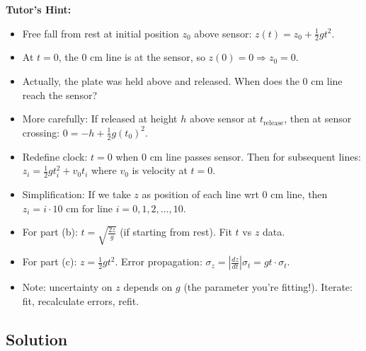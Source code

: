 \documentclass[11pt]{article}
\begin{document}
\textbf{Tutor's Hint:}
\begin{itemize}
    \item Free fall from rest at initial position $z_0$ above sensor: $z(t) = z_0 + \frac{1}{2}gt^2$.
    \item At $t=0$, the 0 cm line is at the sensor, so $z(0) = 0 \Rightarrow z_0 = 0$.
    \item Actually, the plate was held above and released. When does the 0 cm line reach the sensor?
    \item More carefully: If released at height $h$ above sensor at $t_{\text{release}}$, then at sensor crossing: $0 = -h + \frac{1}{2}g(t_0)^2$.
    \item Redefine clock: $t = 0$ when 0 cm line passes sensor. Then for subsequent lines: $z_i = \frac{1}{2}gt_i^2 + v_0 t_i$ where $v_0$ is velocity at $t=0$.
    \item Simplification: If we take $z$ as position of each line wrt 0 cm line, then $z_i = i \cdot 10$ cm for line $i = 0, 1, 2, \ldots, 10$.
    \item For part (b): $t = \sqrt{\frac{2z}{g}}$ (if starting from rest). Fit $t$ vs $z$ data.
    \item For part (c): $z = \frac{1}{2}gt^2$. Error propagation: $\sigma_z = \left|\frac{dz}{dt}\right| \sigma_t = gt \cdot \sigma_t$.
    \item Note: uncertainty on $z$ depends on $g$ (the parameter you're fitting!). Iterate: fit, recalculate errors, refit.
\end{itemize}

\subsection{Solution}
\end{document}
